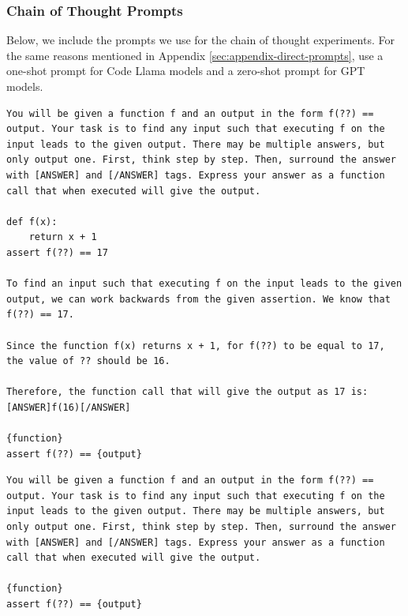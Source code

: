 \subsubsection{Chain of Thought Prompts}\label{sec:appendix-cot-prompts}
Below, we include the prompts we use for the chain of thought experiments. For the same reasons mentioned in Appendix \ref{sec:appendix-direct-prompts}, use a one-shot prompt for Code Llama models and a zero-shot prompt for GPT models. 

\begin{lstlisting}[caption={CoT input prediction prompt (Code Llama)},label={lst:benchmark-cot-input-prompt-llama}, captionpos=t, breaklines=true]
You will be given a function f and an output in the form f(??) == output. Your task is to find any input such that executing f on the input leads to the given output. There may be multiple answers, but only output one. First, think step by step. Then, surround the answer with [ANSWER] and [/ANSWER] tags. Express your answer as a function call that when executed will give the output.

def f(x):
    return x + 1
assert f(??) == 17

To find an input such that executing f on the input leads to the given output, we can work backwards from the given assertion. We know that f(??) == 17. 

Since the function f(x) returns x + 1, for f(??) to be equal to 17, the value of ?? should be 16. 

Therefore, the function call that will give the output as 17 is:
[ANSWER]f(16)[/ANSWER]    

{function}
assert f(??) == {output}
\end{lstlisting}

\begin{lstlisting}[caption={CoT input prediction prompt (GPT)},label={lst:benchmark-cot-input-prompt-gpt}, captionpos=t, breaklines=true]
You will be given a function f and an output in the form f(??) == output. Your task is to find any input such that executing f on the input leads to the given output. There may be multiple answers, but only output one. First, think step by step. Then, surround the answer with [ANSWER] and [/ANSWER] tags. Express your answer as a function call that when executed will give the output.

{function}
assert f(??) == {output}
\end{lstlisting}


